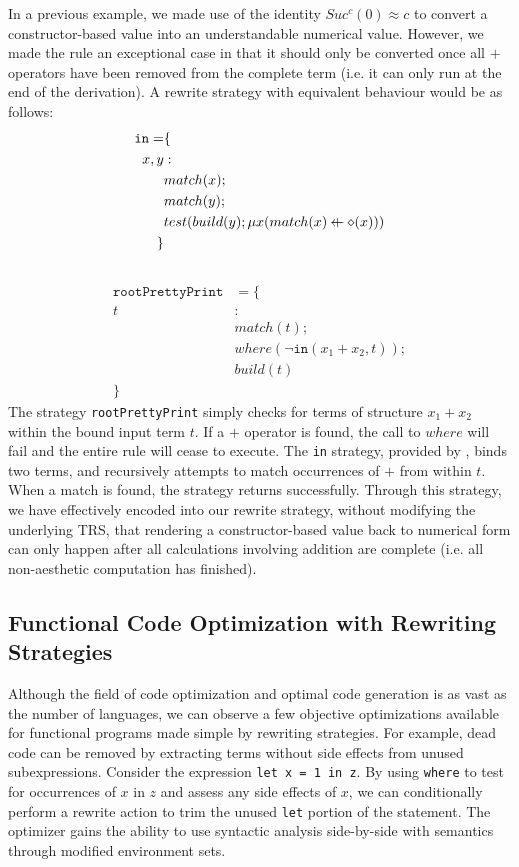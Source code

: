 \documentclass{article}
\makeatletter
\newcommand{\superimpose}[2]{{%
  \ooalign{%
    \hfil$\m@th#1\@firstoftwo#2$\hfil\cr
    \hfil$\m@th#1\@secondoftwo#2$\hfil\cr
  }%
}}
\newcommand{\leftplus}{\mathbin{\mathpalette\superimpose{{\leftarrow}{+}}}}
\makeatother
\begin{document}
In a previous example, we made use of the identity $Suc^c(0) \approx c$ to convert a constructor-based value into an understandable numerical value.
However, we made the rule an exceptional case in that it should only be converted once all $+$ operators have been removed from the complete term
(i.e. it can only run at the end of the derivation). A rewrite strategy with equivalent behaviour would be as follows:
\begin{align*}
    \texttt{in} = &\{\\
        x,y&:\\
        &match(x);\\
        &match(y);\\
        &test(build(y);\mu x(match(x) \leftplus \diamond(x)))\\
        \}\\\\
\end{align*}
\begin{align*}
\texttt{rootPrettyPrint} &= \{\\
        t&:\\
        &match(t);\\
        &where(\lnot \texttt{in}(x_1+x_2, t));\\
        &build(t)\\
        \}
\end{align*}
The strategy \texttt{rootPrettyPrint} simply checks for terms of structure $x_1+x_2$ within the bound input term $t$. If a $+$ operator is found,
the call to $where$ will fail and the entire rule will cease to execute. The \texttt{in} strategy, provided by \cite{elco1998building},
binds two terms, and recursively attempts to match occurrences of $+$ from within $t$. When a match is found, the strategy returns successfully.
Through this strategy, we have effectively encoded into our rewrite strategy, without modifying the underlying TRS,
that rendering a constructor-based value back to numerical form
can only happen after all calculations involving addition are complete (i.e. all non-aesthetic computation has finished).

\subsection{Functional Code Optimization with Rewriting Strategies}
Although the field of code optimization and optimal code generation is as vast as the number of languages,
we can observe a few objective optimizations available for functional programs made simple by rewriting strategies.
For example, dead code can be removed by extracting terms without side effects from unused subexpressions. Consider
the expression \texttt{let x = 1 in z}. By using \texttt{where} to test for occurrences of $x$ in $z$
and assess any side effects of $x$,
we can conditionally perform a rewrite action to trim the unused \texttt{let} portion of the statement.
The optimizer gains the ability to use syntactic analysis side-by-side with semantics through modified environment sets.
\end{document}
